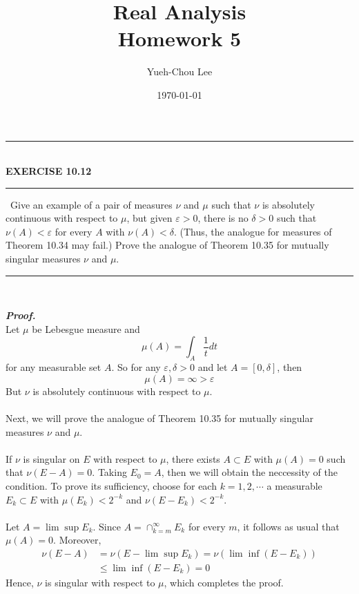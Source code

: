 \documentclass[a4paper,11pt]{article}
\title{Real Analysis\\ Homework 5}
\author{Yueh-Chou Lee}
\date{\today}
\begin{document}
\maketitle

	\begin{flushleft}
		\rule[-0.5ex]{17cm}{2pt}\\
			\textbf{EXERCISE 10.12}\\
		\rule[1.5ex]{17cm}{0.5pt}\
		Give an example of a pair of measures $\nu$ and $\mu$ such that $\nu$ is absolutely continuous with respect to $\mu$, but given $\varepsilon > 0$, there is no $\delta > 0$ such that $\nu(A) < \varepsilon$ for every $A$ with $\nu(A) < \delta$. (Thus, the analogue for measures of Theorem 10.34 may fail.)
		\newline
		Prove the analogue of Theorem 10.35 for mutually singular measures $\nu$ and $\mu$.\\
	\rule[1.0ex]{17cm}{0.5pt}\
	\end{flushleft}	
	\textit{\textbf {Proof.}}\\
	Let $\mu$ be Lebesgue measure and
		$$\mu(A) = \int_A \frac{1}{t} dt$$
	for any measurable set $A$. So for any $\varepsilon, \delta > 0$ and let $A = [0,\delta]$, then
		$$\mu(A) = \infty > \varepsilon$$
	But $\nu$ is absolutely continuous with respect to $\mu$.\\\\
	Next, we will prove the analogue of Theorem 10.35 for mutually singular measures $\nu$ and $\mu$.\\\\
	If $\nu$ is singular on $E$ with respect to $\mu$, there exists $A \subset E$ with $\mu(A) = 0$ such that $\nu(E - A) = 0$. Taking $E_0 = A$, then we will obtain the neccessity of the condition. To prove its sufficiency, choose for each $k = 1,2,\cdots$ a measurable $E_k \subset E$ with $\mu(E_k) < 2^{-k}$ and $\nu(E - E_k) < 2^{-k}$.\\\\
	Let $A = \lim \sup E_k$. Since $A = \cap_{k = m}^\infty E_k$ for every $m$, it follows as usual that $\mu(A) = 0$. Moreover,
		$$\begin{aligned}
		\nu(E - A)
		&= \nu(E - \lim \sup E_k)
		= \nu(\lim \inf (E - E_k))\\
		&\leq \lim \inf (E - E_k) = 0
		\end{aligned}$$
	Hence, $\nu$ is singular with respect to $\mu$, which completes the proof.\\
\end{document}
